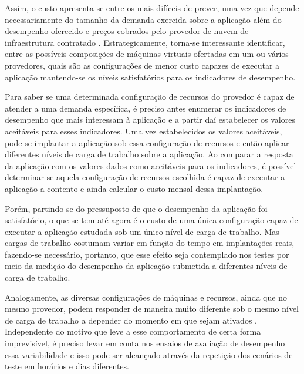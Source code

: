Assim, o custo apresenta-se entre os mais difíceis de prever, uma vez que depende necessariamente 
do tamanho da demanda exercida sobre a aplicação além do desempenho oferecido e preços cobrados 
pelo provedor de nuvem de infraestrutura contratado \cite{cunha2012ambiente}. Estrategicamente, 
torna-se interessante identificar, entre as possíveis composições de máquinas virtuais ofertadas 
em um ou vários provedores, quais são as configurações de menor custo capazes de executar a 
aplicação mantendo-se os níveis satisfatórios para os indicadores de desempenho.

Para saber se uma determinada configuração de recursos do provedor é capaz de atender a uma 
demanda específica, é preciso antes enumerar os indicadores de desempenho que mais interessam 
à aplicação e a partir daí estabelecer os valores aceitáveis para esses indicadores. Uma vez 
estabelecidos os valores aceitáveis, pode-se implantar a aplicação sob essa configuração de 
recursos e então aplicar diferentes níveis de carga de trabalho sobre a aplicação. Ao comparar 
a resposta da aplicação com os valores dados como aceitáveis para os indicadores, é possível 
determinar se aquela configuração de recursos escolhida é capaz de executar a aplicação a 
contento e ainda calcular o custo mensal dessa implantação.

Porém, partindo-se do pressuposto de que o desempenho da aplicação foi satisfatório, o que se 
tem até agora é o custo de uma única configuração capaz de executar a aplicação estudada sob 
um único nível de carga de trabalho. Mas cargas de trabalho costumam variar em função do tempo 
em implantações reais, fazendo-se necessário, portanto, que esse efeito seja contemplado nos 
testes por meio da medição do desempenho da aplicação submetida a diferentes níveis de carga 
de trabalho.

Analogamente, as diversas configurações de máquinas e recursos, ainda que no mesmo provedor, 
podem responder de maneira muito diferente sob o mesmo nível de carga de trabalho a depender 
do momento em que sejam ativados \cite{cunha2011investigating, iosup2011performance, 
jayasinghe2011variations}. Independente do motivo que leve a esse comportamento de certa 
forma imprevisível, é preciso levar em conta nos ensaios de avaliação de desempenho essa 
variabilidade e isso pode ser alcançado através da repetição dos cenários de teste em horários 
e dias diferentes.

